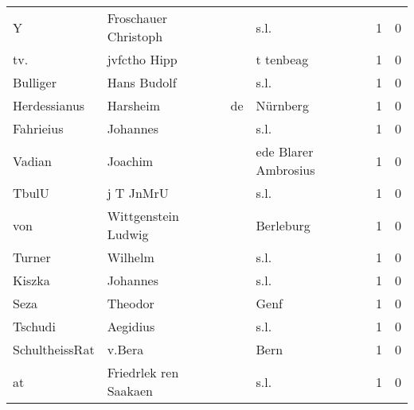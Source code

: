 \begin{center}
\begin{tiny}
\begin{longtabu}{llllrr}
                        Y &               Froschauer Christoph &             &                                        s.l. &          1 &         0 \\
                      tv. &                       jvfctho Hipp &             &                                   t tenbeag &          1 &         0 \\
                 Bulliger &                        Hans Budolf &             &                                        s.l. &          1 &         0 \\
             Herdessianus &                           Harsheim &          de &                                    Nürnberg &          1 &         0 \\
                Fahrieius &                           Johannes &             &                                        s.l. &          1 &         0 \\
                   Vadian &                            Joachim &             &                        ede Blarer Ambrosius &          1 &         0 \\
                    TbulU &                          j T JnMrU &             &                                        s.l. &          1 &         0 \\
                      von &                Wittgenstein Ludwig &             &                                   Berleburg &          1 &         0 \\
                   Turner &                            Wilhelm &             &                                        s.l. &          1 &         0 \\
                   Kiszka &                           Johannes &             &                                        s.l. &          1 &         0 \\
                     Seza &                            Theodor &             &                                        Genf &          1 &         0 \\
                  Tschudi &                           Aegidius &             &                                        s.l. &          1 &         0 \\
           SchultheissRat &                             v.Bera &             &                                        Bern &          1 &         0 \\
                       at &              Friedrlek ren Saakaen &             &                                        s.l. &          1 &         0 \\

\end{longtabu}
\end{tiny}
\end{center}
